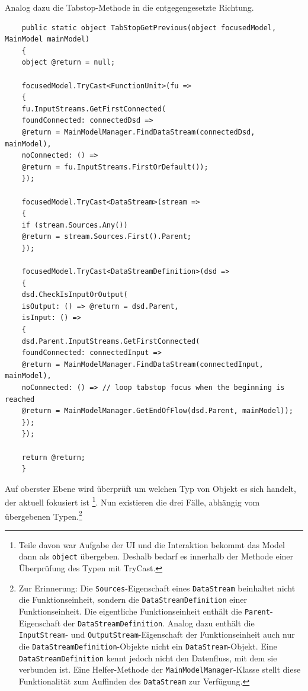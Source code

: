 \begin{enumerate}
	Analog dazu die Tabstop-Methode in die entgegengesetzte Richtung.
	
	
	\begin{verbatim}
	public static object TabStopGetPrevious(object focusedModel, MainModel mainModel)
	{
	object @return = null;
	
	focusedModel.TryCast<FunctionUnit>(fu => 
	{
	fu.InputStreams.GetFirstConnected(
	foundConnected: connectedDsd => 
	@return = MainModelManager.FindDataStream(connectedDsd, mainModel),
	noConnected: () =>
	@return = fu.InputStreams.FirstOrDefault());
	});
	
	focusedModel.TryCast<DataStream>(stream => 
	{
	if (stream.Sources.Any())
	@return = stream.Sources.First().Parent;
	});
	
	focusedModel.TryCast<DataStreamDefinition>(dsd => 
	{
	dsd.CheckIsInputOrOutput(
	isOutput: () => @return = dsd.Parent,
	isInput: () => 
	{
	dsd.Parent.InputStreams.GetFirstConnected(
	foundConnected: connectedInput =>
	@return = MainModelManager.FindDataStream(connectedInput, mainModel),
	noConnected: () => // loop tabstop focus when the beginning is reached
	@return = MainModelManager.GetEndOfFlow(dsd.Parent, mainModel));
	});
	});
	
	return @return;
	}
	\end{verbatim}
	
	

	Auf oberster Ebene wird überprüft um welchen Typ von Objekt es sich
	handelt, der aktuell fokusiert ist \footnote{Teile davon war Aufgabe der UI und die
	Interaktion bekommt das Model dann als \texttt{object} übergeben. Deshalb bedarf es
	innerhalb der Methode einer Überprüfung des Typen mit TryCast.}. Nun existieren die drei Fälle, abhängig vom übergebenen Typen.\footnote{Zur Erinnerung: Die \texttt{Sources}-Eigenschaft eines \texttt{DataStream} beinhaltet nicht die Funktionseinheit,
	sondern die \texttt{DataStreamDefinition} einer Funktionseinheit. Die eigentliche
	Funktionseinheit enthält die \texttt{Parent}-Eigenschaft der \texttt{DataStreamDefinition}.
	Analog dazu enthält die \texttt{InputStream}- und \texttt{OutputStream}-Eigenschaft der
	Funktionseinheit auch nur die \texttt{DataStreamDefinition}-Objekte nicht ein \texttt{DataStream}-Objekt.
	Eine \texttt{DataStreamDefinition} kennt jedoch nicht den Datenfluss, mit dem sie
	verbunden ist. Eine Helfer-Methode der \texttt{MainModelManager}-Klasse stellt
	diese Funktionalität zum Auffinden des \texttt{DataStream} zur Verfügung.}
\end{enumerate}

